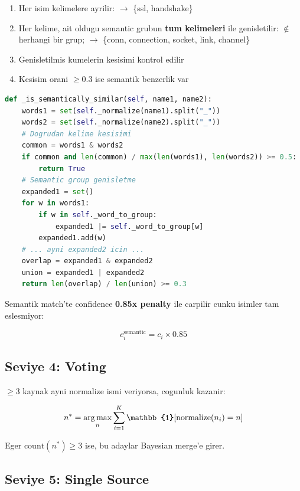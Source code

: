 \begin{enumerate}
\item Her isim kelimelere ayrilir:  $\to$ \{ssl, handshake\}
\item Her kelime, ait oldugu semantic grubun \textbf{tum kelimeleri} ile genisletilir:
       $\notin$ herhangi bir grup;  $\to$ \{conn, connection, socket, link, channel\}
\item Genisletilmis kumelerin kesisimi kontrol edilir
\item Kesisim orani $\geq 0.3$ ise semantik benzerlik var
\end{enumerate}

\begin{lstlisting}[language=Python, caption={Semantic similarity -- name\_merger.py}]
def _is_semantically_similar(self, name1, name2):
    words1 = set(self._normalize(name1).split("_"))
    words2 = set(self._normalize(name2).split("_"))
    # Dogrudan kelime kesisimi
    common = words1 & words2
    if common and len(common) / max(len(words1), len(words2)) >= 0.5:
        return True
    # Semantic group genisletme
    expanded1 = set()
    for w in words1:
        if w in self._word_to_group:
            expanded1 |= self._word_to_group[w]
        expanded1.add(w)
    # ... ayni expanded2 icin ...
    overlap = expanded1 & expanded2
    union = expanded1 | expanded2
    return len(overlap) / len(union) >= 0.3
\end{lstlisting}

Semantik match'te confidence \textbf{0.85x penalty} ile carpilir cunku isimler tam eslesmiyor:

\begin{equation}
c_i^{\text{semantic}} = c_i \times 0.85
\end{equation}


\subsection{Seviye 4: Voting}

$\geq 3$ kaynak ayni normalize ismi veriyorsa, cogunluk kazanir:

\begin{equation}
n^* = \argmax_{n} \sum_{i=1}^{K} \mathbb{1}[\text{normalize}(n_i) = n]
\end{equation}

Eger $\text{count}(n^*) \geq 3$ ise, bu adaylar Bayesian merge'e girer.

\subsection{Seviye 5: Single Source}

